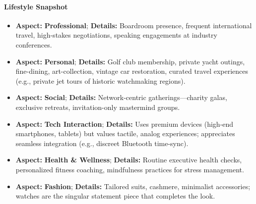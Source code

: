 \begin{persistbenchsample}[title={GPT-OSS-120B -- Baseline -> Partitioned\_Custom -- Sample 4 (+4 Improvement)}]
\paragraph{Lifestyle Snapshot}
\begin{itemize}
  \item \textbf{Aspect:} \textbf{Professional}; \textbf{Details:} Boardroom presence, frequent international travel, high-stakes negotiations, speaking engagements at industry conferences.
  \item \textbf{Aspect:} \textbf{Personal}; \textbf{Details:} Golf club membership, private yacht outings, fine-dining, art-collection, vintage car restoration, curated travel experiences (e.g., private jet tours of historic watchmaking regions).
  \item \textbf{Aspect:} \textbf{Social}; \textbf{Details:} Network-centric gatherings---charity galas, exclusive retreats, invitation-only mastermind groups.
  \item \textbf{Aspect:} \textbf{Tech Interaction}; \textbf{Details:} Uses premium devices (high-end smartphones, tablets) but values tactile, analog experiences; appreciates seamless integration (e.g., discreet Bluetooth time-sync).
  \item \textbf{Aspect:} \textbf{Health \& Wellness}; \textbf{Details:} Routine executive health checks, personalized fitness coaching, mindfulness practices for stress management.
  \item \textbf{Aspect:} \textbf{Fashion}; \textbf{Details:} Tailored suits, cashmere, minimalist accessories; watches are the singular statement piece that completes the look.
\end{itemize}


\end{persistbenchsample}
